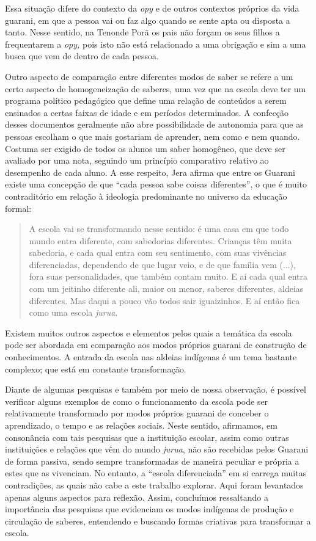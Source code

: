 Essa situação difere do contexto da \emph{opy} e de outros contextos
próprios da vida guarani, em que a pessoa vai ou faz algo quando se
sente apta ou disposta a tanto. Nesse sentido, na Tenonde Porã os pais
não forçam os seus filhos a frequentarem a \emph{opy,} pois isto não
está relacionado a uma obrigação e sim a uma busca que vem de dentro de
cada pessoa.

Outro aspecto de comparação entre diferentes modos de saber se refere a
um certo aspecto de homogeneização de saberes, uma vez que na escola
deve ter um programa político pedagógico que define uma relação de
conteúdos a serem ensinados a certas faixas de idade e em períodos
determinados. A confecção desses documentos geralmente não abre
possibilidade de autonomia para que as pessoas escolham o que mais
gostariam de aprender, nem como e nem quando. Costuma ser exigido de
todos os alunos um saber homogêneo, que deve ser avaliado por uma nota,
seguindo um princípio comparativo relativo ao desempenho de cada aluno.
A esse respeito, Jera afirma que entre os Guarani existe uma concepção
de que ``cada pessoa sabe coisas diferentes'', o que é muito
contraditório em relação à ideologia predominante no universo da
educação formal:

\begin{quote}
A escola vai se transformando nesse sentido: é uma casa em que todo
mundo entra diferente, com sabedorias diferentes. Crianças têm muita
sabedoria, e cada qual entra com seu sentimento, com suas vivências
diferenciadas, dependendo de que lugar veio, e de que família vem (...),
fora suas personalidades, que também contam muito. E aí cada qual entra
com um jeitinho diferente ali, maior ou menor, saberes diferentes,
aldeias diferentes. Mas daqui a pouco vão todos sair iguaizinhos. E aí
então fica como uma escola \emph{jurua}.
\end{quote}

Existem muitos outros aspectos e elementos pelos quais a temática da
escola pode ser abordada em comparação aos modos próprios guarani de
construção de conhecimentos. A entrada da escola nas aldeias indígenas é
um tema bastante complexo\sout{,} que está em constante transformação.

Diante de algumas pesquisas e também por meio de nossa observação, é
possível verificar alguns exemplos de como o funcionamento da escola
pode ser relativamente transformado por modos próprios guarani de
conceber o aprendizado, o tempo e as relações sociais. Neste sentido,
afirmamos, em consonância com tais pesquisas que a instituição escolar,
assim como outras instituições e relações que vêm do mundo \emph{jurua},
não são recebidas pelos Guarani de forma passiva, sendo sempre
transformadas de maneira peculiar e própria a estes que as vivenciam. No
entanto, a ``escola diferenciada'' em si carrega muitas contradições, as
quais não cabe a este trabalho explorar. Aqui foram levantados apenas
alguns aspectos para reflexão. Assim, concluímos ressaltando a
importância das pesquisas que evidenciam os modos indígenas de produção
e circulação de saberes, entendendo e buscando formas criativas para
transformar a escola.


